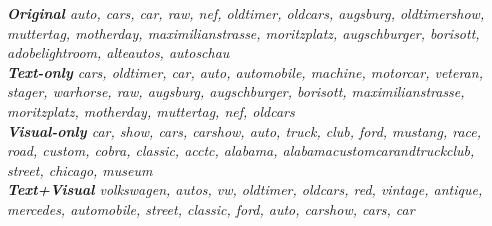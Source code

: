\documentclass[12pt]{article}
\begin{document}
\emph{\textbf{Original} auto, cars, car, raw, nef, oldtimer, oldcars, augsburg, oldtimershow, muttertag, motherday, maximilianstrasse, moritzplatz, augschburger, borisott, adobelightroom, alteautos, autoschau \\
\textbf{Text-only} cars, oldtimer, car, auto, automobile, machine, motorcar, veteran, stager, warhorse, raw, augsburg, augschburger, borisott, maximilianstrasse, moritzplatz, motherday, muttertag, nef, oldcars \\
\textbf{Visual-only} car, show, cars, carshow, auto, truck, club, ford, mustang, race, road, custom, cobra, classic, acctc, alabama, alabamacustomcarandtruckclub, street, chicago, museum\\
\textbf{Text+Visual} volkswagen, autos, vw, oldtimer, oldcars, red, vintage, antique, mercedes, automobile, street, classic, ford, auto, carshow, cars, car}
\end{document}
